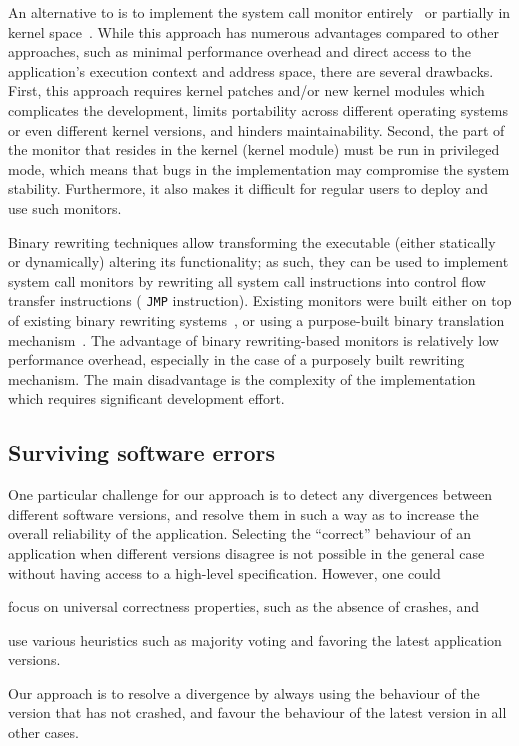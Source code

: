 An alternative to \ptrace is to implement the system call monitor
entirely~\cite{provos2002,cox2006} or partially in kernel space~\cite{ostia}.
While this approach has numerous advantages compared to other approaches, such
as minimal performance overhead and direct access to the application's
execution context and address space, there are several drawbacks.  First, this
approach requires kernel patches and/or new kernel modules which complicates
the development, limits portability across different operating systems or even
different kernel versions, and hinders maintainability. Second, the part of the
monitor that resides in the kernel (\ie kernel module) must be run in
privileged mode, which means that bugs in the implementation may compromise the
system stability. Furthermore, it also makes it difficult for regular users to
deploy and use such monitors.

Binary rewriting techniques allow transforming the executable (either statically
or dynamically) altering its functionality; as such, they can be used to
implement system call monitors by rewriting all system call instructions into 
control flow transfer instructions (\eg
\lstinline[language={[x64]Assembler}]`JMP` instruction). Existing monitors were
built either on top of existing binary rewriting
systems~\cite{onlinevalidation}, or using a purpose-built binary translation
mechanism~\cite{vx32}. The advantage of binary rewriting-based monitors is
relatively low performance overhead, especially in the case of a purposely
built rewriting mechanism. The main disadvantage is the complexity of the
implementation which requires significant development effort.

\subsection{Surviving software errors}

One particular challenge for our approach is to detect any divergences between
different software versions, and resolve them in such a way as to increase the
overall reliability of the application.  Selecting the ``correct'' behaviour of
an application when different versions disagree is not possible in the general
case without having access to a high-level specification.  However, one could%
\begin{inparaenum}[(1)]
\item focus on universal correctness properties, such as the absence of
  crashes, and
\item use various heuristics such as majority voting and favoring the latest
  application versions.
\end{inparaenum}
Our approach is to resolve a divergence by always using the behaviour of the
version that has not crashed, and favour the behaviour of the latest version in
all other cases. %

